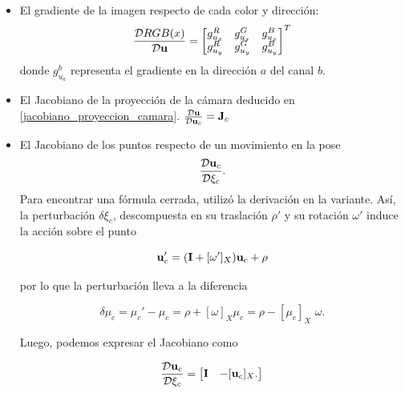 \begin{itemize}
    \item 
    El gradiente de la imagen respecto de cada color y dirección:
    \begin{equation}
    \frac{\mathcal{D}RGB(x)}{\mathcal{D}\mathbf{u}} =
    \begin{bmatrix}
        g_{u_x}^R & g_{u_x}^G & g_{u_x}^B\\
        g_{u_y}^R & g_{u_y}^G & g_{u_y}^B
    \end{bmatrix} ^T
    \end{equation}
    donde $g_{u_a}^b$ representa el gradiente en la dirección $a$ del canal $b$.
    
    \item 
    El Jacobiano de la proyección de la cámara deducido en \ref{jacobiano_proyeccion_camara}.
    $\frac{\mathcal{D}\mathbf{u}}{\mathcal{D}\mathbf{u}_c} = \mathbf{J}_c$

    \item 
    El Jacobiano de los puntos respecto de un movimiento en la pose
    \begin{equation}
    \frac{\mathcal{D}\mathbf{u}_c}{\mathcal{D}\xi_c}.
    \end{equation}
    Para encontrar una fórmula cerrada, \cite{Matsuki2024GaussianSplattingSLAM} utilizó la derivación en la variante. Así, la perturbación $\delta \xi_c$, descompuesta en su traslación $\rho'$ y su rotación $\omega'$ induce la acción sobre el punto
    
    \begin{equation}
    \mathbf{u}_c' = (\mathbf{I} + [\omega']_X) \mathbf{u}_c + \rho
    \end{equation}

    por lo que la perturbación lleva a la diferencia

    \begin{equation}
    \delta\mu_c = \mu_c' - \mu_c = \rho + [\omega]_X \mu_c = \rho - [\mu_c]_X \,\,\omega.
    \end{equation}

    Luego, podemos expresar el Jacobiano como

    \begin{equation}
    \frac{\mathcal{D}\mathbf{u}_c}{\mathcal{D}\xi_c} = 
    \begin{bmatrix}
        \mathbf{I} & -[\mathbf{u}_c]_X.
    \end{bmatrix}
    \label{jacobiano_puntos_pose}
    \end{equation}
\end{itemize}

